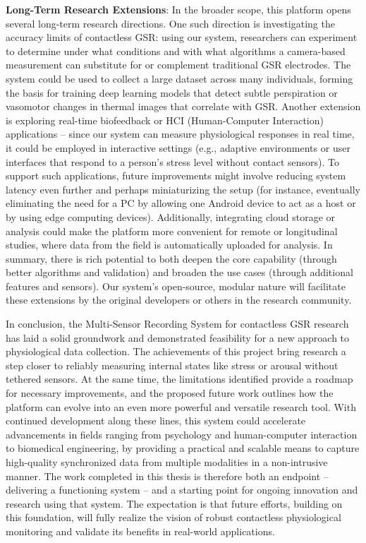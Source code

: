 \textbf{Long-Term Research Extensions}: In the broader scope, this platform opens several long-term research directions. One such direction is investigating the accuracy limits of contactless GSR: using our system, researchers can experiment to determine under what conditions and with what algorithms a camera-based measurement can substitute for or complement traditional GSR electrodes. The system could be used to collect a large dataset across many individuals, forming the basis for training deep learning models that detect subtle perspiration or vasomotor changes in thermal images that correlate with GSR. Another extension is exploring real-time biofeedback or HCI (Human-Computer Interaction) applications -- since our system can measure physiological responses in real time, it could be employed in interactive settings (e.g., adaptive environments or user interfaces that respond to a person's stress level without contact sensors). To support such applications, future improvements might involve reducing system latency even further and perhaps miniaturizing the setup (for instance, eventually eliminating the need for a PC by allowing one Android device to act as a host or by using edge computing devices). Additionally, integrating cloud storage or analysis could make the platform more convenient for remote or longitudinal studies, where data from the field is automatically uploaded for analysis. In summary, there is rich potential to both deepen the core capability (through better algorithms and validation) and broaden the use cases (through additional features and sensors). Our system's open-source, modular nature will facilitate these extensions by the original developers or others in the research community.

In conclusion, the Multi-Sensor Recording System for contactless GSR research has laid a solid groundwork and demonstrated feasibility for a new approach to physiological data collection. The achievements of this project bring research a step closer to reliably measuring internal states like stress or arousal without tethered sensors. At the same time, the limitations identified provide a roadmap for necessary improvements, and the proposed future work outlines how the platform can evolve into an even more powerful and versatile research tool. With continued development along these lines, this system could accelerate advancements in fields ranging from psychology and human-computer interaction to biomedical engineering, by providing a practical and scalable means to capture high-quality synchronized data from multiple modalities in a non-intrusive manner. The work completed in this thesis is therefore both an endpoint -- delivering a functioning system -- and a starting point for ongoing innovation and research using that system. The expectation is that future efforts, building on this foundation, will fully realize the vision of robust contactless physiological monitoring and validate its benefits in real-world applications.
